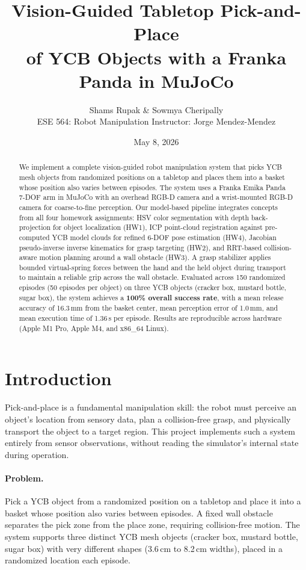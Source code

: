 \documentclass[11pt]{article}
\title{\textbf{Vision-Guided Tabletop Pick-and-Place\\of YCB Objects with a Franka Panda in MuJoCo}}
\author{Shams Rupak \quad \& \quad Sowmya Cheripally\\ESE 564: Robot Manipulation \quad Instructor: Jorge Mendez-Mendez}
\date{May 8, 2026}
\begin{document}
\maketitle

\begin{abstract}
We implement a complete vision-guided robot manipulation system that picks
YCB mesh objects from randomized positions on a tabletop and places them
into a basket whose position also varies between episodes. The system uses
a Franka Emika Panda 7-DOF arm in MuJoCo with an overhead RGB-D camera and
a wrist-mounted RGB-D camera for coarse-to-fine perception. Our model-based
pipeline integrates concepts from all four homework assignments: HSV color
segmentation with depth back-projection for object localization (HW1), ICP
point-cloud registration against pre-computed YCB model clouds for refined
6-DOF pose estimation (HW4), Jacobian pseudo-inverse inverse kinematics for
grasp targeting (HW2), and RRT-based collision-aware motion planning around
a wall obstacle (HW3). A grasp stabilizer applies bounded virtual-spring
forces between the hand and the held object during transport to maintain a
reliable grip across the wall obstacle. Evaluated across 150 randomized
episodes (50 episodes per object) on three YCB objects (cracker box,
mustard bottle, sugar box), the system achieves a \textbf{100\% overall
success rate}, with a mean release accuracy of 16.3\,mm from the basket
center, mean perception error of 1.0\,mm, and mean execution time of 1.36\,s
per episode. Results are reproducible across hardware (Apple M1 Pro,
Apple M4, and x86\_64 Linux).
\end{abstract}

\section{Introduction}

Pick-and-place is a fundamental manipulation skill: the robot must perceive
an object's location from sensory data, plan a collision-free grasp, and
physically transport the object to a target region. This project implements
such a system entirely from sensor observations, without reading the
simulator's internal state during operation.

\paragraph{Problem.} Pick a YCB object from a randomized position on a
tabletop and place it into a basket whose position also varies between
episodes. A fixed wall obstacle separates the pick zone from the place
zone, requiring collision-free motion. The system supports three distinct
YCB mesh objects (cracker box, mustard bottle, sugar box) with very
different shapes (3.6\,cm to 8.2\,cm widths), placed in a randomized
location each episode.
\end{document}
